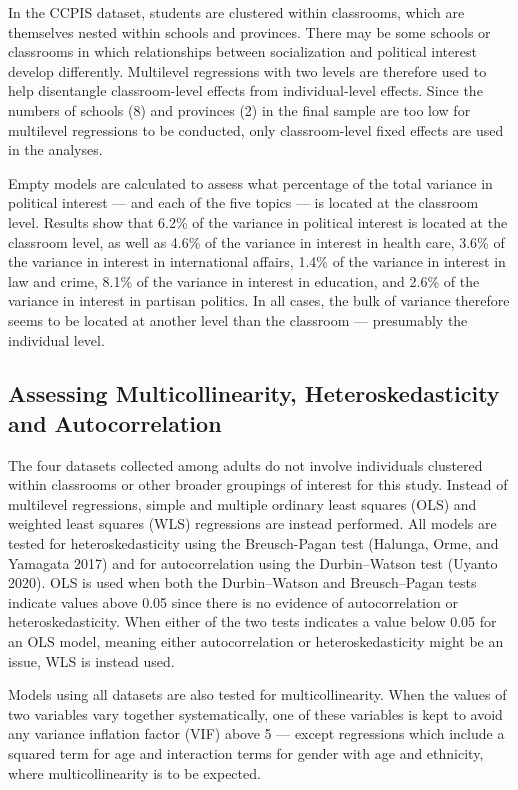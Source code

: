 \documentclass[
  letterpaper,
  DIV=11,
  numbers=noendperiod]{scrreprt}
\begin{document}
In the CCPIS dataset, students are clustered within classrooms, which
are themselves nested within schools and provinces. There may be some
schools or classrooms in which relationships between socialization and
political interest develop differently. Multilevel regressions with two
levels are therefore used to help disentangle classroom-level effects
from individual-level effects. Since the numbers of schools (8) and
provinces (2) in the final sample are too low for multilevel regressions
to be conducted, only classroom-level fixed effects are used in the
analyses.

Empty models are calculated to assess what percentage of the total
variance in political interest --- and each of the five topics --- is
located at the classroom level. Results show that 6.2\% of the variance
in political interest is located at the classroom level, as well as
4.6\% of the variance in interest in health care, 3.6\% of the variance
in interest in international affairs, 1.4\% of the variance in interest
in law and crime, 8.1\% of the variance in interest in education, and
2.6\% of the variance in interest in partisan politics. In all cases,
the bulk of variance therefore seems to be located at another level than
the classroom --- presumably the individual level.

\subsection{Assessing Multicollinearity, Heteroskedasticity and
Autocorrelation}\label{assessing-multicollinearity-heteroskedasticity-and-autocorrelation}

The four datasets collected among adults do not involve individuals
clustered within classrooms or other broader groupings of interest for
this study. Instead of multilevel regressions, simple and multiple
ordinary least squares (OLS) and weighted least squares (WLS)
regressions are instead performed. All models are tested for
heteroskedasticity using the Breusch-Pagan test (Halunga, Orme, and
Yamagata 2017) and for autocorrelation using the Durbin--Watson test
(Uyanto 2020). OLS is used when both the Durbin--Watson and
Breusch--Pagan tests indicate values above 0.05 since there is no
evidence of autocorrelation or heteroskedasticity. When either of the
two tests indicates a value below 0.05 for an OLS model, meaning either
autocorrelation or heteroskedasticity might be an issue, WLS is instead
used.

Models using all datasets are also tested for multicollinearity. When
the values of two variables vary together systematically, one of these
variables is kept to avoid any variance inflation factor (VIF) above 5
--- except regressions which include a squared term for age and
interaction terms for gender with age and ethnicity, where
multicollinearity is to be expected.
\end{document}
